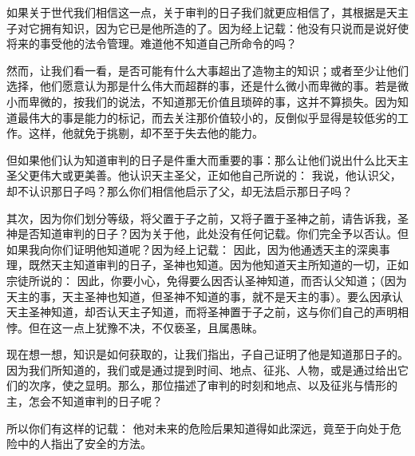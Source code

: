 如果关于世代我们相信这一点，关于审判的日子我们就更应相信了，其根据是天主子对它拥有知识，因为它已是他所造的了。因为经上记载：他没有只说而是说好使将来的事受他的法令管理。难道他不知道自己所命令的吗？\par

然而，让我们看一看，是否可能有什么大事超出了造物主的知识；或者至少让他们选择，他们愿意认为那是什么伟大而超群的事，还是什么微小而卑微的事。若是微小而卑微的，按我们的说法，不知道那无价值且琐碎的事，这并不算损失。因为知道最伟大的事是能力的标记，而去关注那价值较小的，反倒似乎显得是较低劣的工作。这样，他就免于挑剔，却不至于失去他的能力。\par

但如果他们认为知道审判的日子是件重大而重要的事：那么让他们说出什么比天主圣父更伟大或更美善。他认识天主圣父，正如他自己所说的： 我说，他认识父，却不认识那日子吗？那么你们相信他启示了父，却无法启示那日子吗？\par

其次，因为你们划分等级，将父置于子之前，又将子置于圣神之前，请告诉我，圣神是否知道审判的日子？因为关于他，此处没有任何记载。你们完全予以否认。但如果我向你们证明他知道呢？因为经上记载： 因此，因为他通透天主的深奥事理，既然天主知道审判的日子，圣神也知道。因为他知道天主所知道的一切，正如宗徒所说的： 因此，你要小心，免得要么因否认圣神知道，而否认父知道；（因为天主的事，天主圣神也知道，但圣神不知道的事，就不是天主的事）。要么因承认天主圣神知道，却否认天主子知道，而将圣神置于子之前，这与你们自己的声明相悖。但在这一点上犹豫不决，不仅亵圣，且属愚昧。\par

现在想一想，知识是如何获取的，让我们指出，子自己证明了他是知道那日子的。因为我们所知道的，我们或是通过提到时间、地点、征兆、人物，或是通过给出它们的次序，使之显明。那么，那位描述了审判的时刻和地点、以及征兆与情形的主，怎会不知道审判的日子呢？\par

所以你们有这样的记载： 他对未来的危险后果知道得如此深远，竟至于向处于危险中的人指出了安全的方法。\par

